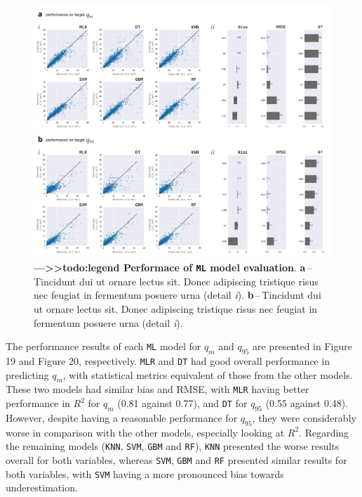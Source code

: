 \documentclass[12pt]{article}
\begin{document}
\begin{figure}[t!] %
	\centering                                       
	\includegraphics[width=0.98\linewidth]{figs/performance.jpg}    
	\caption[Performace of model evaluation]
	{ \textbf{---\;>>todo:legend Performace of \texttt{ML} model evaluation}.
		\textbf{a}\,--\,Tincidunt dui ut ornare lectus sit. Donec adipiscing tristique risus nec feugiat in fermentum posuere urna (detail \textrm{\textit{i}}).
		\textbf{b}\,--\,Tincidunt dui ut ornare lectus sit. Donec adipiscing tristique risus nec feugiat in fermentum posuere urna (detail \textrm{\textit{i}}).		
	}
	\label{fig:perf}  %
\end{figure}

\par The performance results of each \texttt{ML} model for $q_{m}$ and $q_{95}$ are presented in Figure 19 and Figure 20, respectively. \texttt{MLR} and \texttt{DT} had good overall performance in predicting $q_{m}$, with statistical metrics equivalent of those from the other models. These two models had similar bias and RMSE, with \texttt{MLR} having better performance in $R^2$ for $q_{m}$ (0.81 against 0.77), and \texttt{DT} for $q_{95}$ (0.55 against 0.48). However, despite having a reasonable performance for $q_{95}$, they were considerably worse in comparison with the other models, especially looking at $R^2$. Regarding the remaining models (\texttt{KNN}, \texttt{SVM}, \texttt{GBM} and \texttt{RF}), \texttt{KNN} presented the worse results overall for both variables, whereas \texttt{SVM}, \texttt{GBM} and \texttt{RF} presented similar results for both variables, with \texttt{SVM} having a more pronounced bias towards underestimation.
\end{document}
